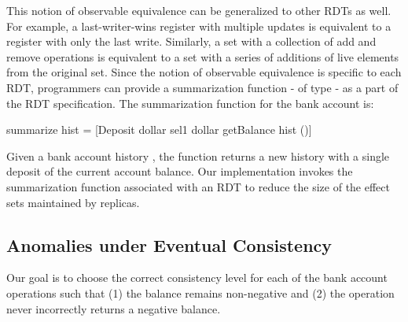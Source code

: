 This notion of observable equivalence can be generalized to other RDTs as well.
For example, a last-writer-wins register with multiple updates is equivalent to
a register with only the last write. Similarly, a set with a collection of add
and remove operations is equivalent to a set with a series of additions of live
elements from the original set. Since the notion of observable equivalence is
specific to each RDT, programmers can provide a summarization
function - of type \cf{[e] -> [e]} -  as a part of
the RDT specification. The summarization function for the bank account is:

\begin{codehaskell}
 summarize hist =
   [Deposit dollar sel1 dollar getBalance hist ()]
\end{codehaskell}

\noindent Given a bank account history , the 
function returns a new history with a single deposit of the current
account balance. Our implementation invokes the summarization function
associated with an RDT to reduce the size of the effect sets
maintained by replicas.

\subsection{Anomalies under Eventual Consistency}

Our goal is to choose the correct consistency level for each of the bank
account operations such that (1) the balance remains non-negative and (2) the
 operation never incorrectly returns a negative balance.


